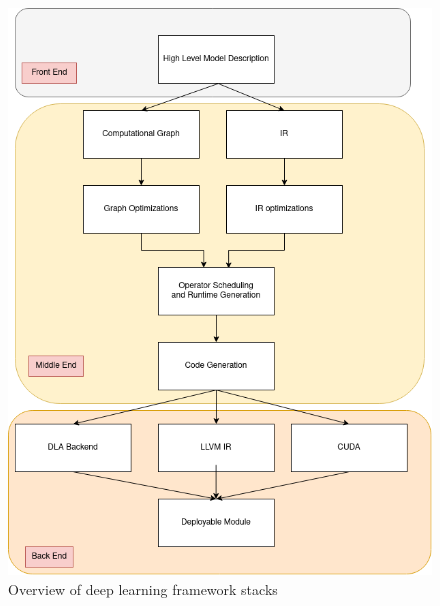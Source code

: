 \begin{figure}[th]
\centering
\includegraphics[scale=0.5]{Figures/framework_stack.png}
\decoRule
\caption[dlFramework]{Overview of deep learning framework stacks}
\label{fig:dlFramework}
\end{figure}


